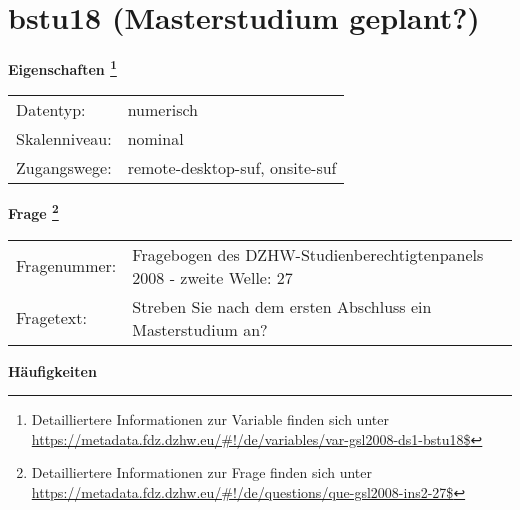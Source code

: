 
    \setcounter{footnote}{0}

    \vspace*{-1.8cm}
	\section{bstu18 (Masterstudium geplant?)}
	\label{section:bstu18}



    \vspace*{0.5cm}
    \noindent\textbf{Eigenschaften
	\footnote{Detailliertere Informationen zur Variable finden sich unter
		\url{https://metadata.fdz.dzhw.eu/\#!/de/variables/var-gsl2008-ds1-bstu18$}}}\\
	\begin{tabularx}{\hsize}{@{}lX}
	Datentyp: & numerisch \\
	Skalenniveau: & nominal \\
	Zugangswege: &
	  remote-desktop-suf, 
	  onsite-suf
 \\
    \end{tabularx}



				\vspace*{0.5cm}
                \noindent\textbf{Frage
	                \footnote{Detailliertere Informationen zur Frage finden sich unter
		              \url{https://metadata.fdz.dzhw.eu/\#!/de/questions/que-gsl2008-ins2-27$}}}\\
				\begin{tabularx}{\hsize}{@{}lX}
					Fragenummer: &
					  Fragebogen des DZHW-Studienberechtigtenpanels 2008 - zweite Welle:
					  27
 \\
					Fragetext: & Streben Sie nach dem ersten Abschluss ein Masterstudium an? \\
				\end{tabularx}





        		\vspace*{0.5cm}
                \noindent\textbf{Häufigkeiten}

